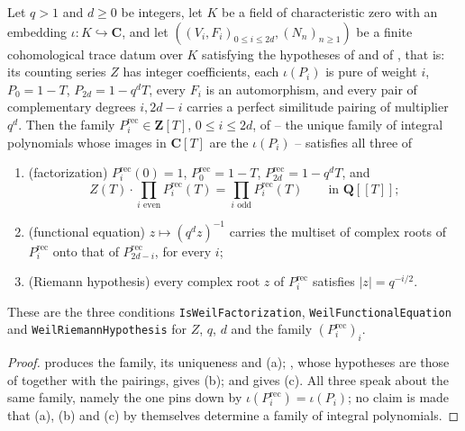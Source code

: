 \begin{theorem}
\label{thm:zla-weil-summary}
\leanok
Let $q>1$ and $d\geq0$ be integers, let $K$ be a field of characteristic zero
with an embedding $\iota:K\hookrightarrow\mathbf C$, and let
$((V_i,F_i)_{0\leq i\leq2d},(N_n)_{n\geq1})$ be a finite cohomological trace
datum over $K$ satisfying the hypotheses of
 and of
, that is: its counting series $Z$ has
integer coefficients, each $\iota(P_i)$ is pure of weight $i$,
$P_0=1-T$, $P_{2d}=1-q^dT$, every $F_i$ is an automorphism, and every pair of
complementary degrees $i,2d-i$ carries a perfect similitude pairing of
multiplier $q^d$.  Then the
family $P_i^{\mathrm{rec}}\in\mathbf Z[T]$, $0\leq i\leq2d$, of
 -- the unique family of integral
polynomials whose images in $\mathbf C[T]$ are the $\iota(P_i)$ -- satisfies
all three of
\begin{enumerate}[label=\textup{(\alph*)}]
\item \textup{(factorization)} $P_i^{\mathrm{rec}}(0)=1$,
      $P_0^{\mathrm{rec}}=1-T$, $P_{2d}^{\mathrm{rec}}=1-q^dT$, and
\[
  Z(T)\cdot\prod_{i\text{ even}}P_i^{\mathrm{rec}}(T)
  =\prod_{i\text{ odd}}P_i^{\mathrm{rec}}(T)
  \qquad\text{in }\mathbf Q[[T]];
\]
\item \textup{(functional equation)} $z\mapsto(q^dz)^{-1}$ carries the
      multiset of complex roots of $P_i^{\mathrm{rec}}$ onto that of
      $P_{2d-i}^{\mathrm{rec}}$, for every $i$;
\item \textup{(Riemann hypothesis)} every complex root $z$ of
      $P_i^{\mathrm{rec}}$ satisfies $|z|=q^{-i/2}$.
\end{enumerate}
These are the three conditions
\texttt{IsWeilFactorization}, \texttt{WeilFunctionalEquation} and
\texttt{WeilRiemannHypothesis} for $Z$, $q$, $d$ and the family
$(P_i^{\mathrm{rec}})_i$.
\end{theorem}
\begin{proof}
\leanok
{} produces the family, its uniqueness and
(a); , whose hypotheses are those of
 together with the pairings, gives (b); and
 gives (c).  All three speak about the same
family, namely the one  pins down by
$\iota(P_i^{\mathrm{rec}})=\iota(P_i)$; no claim is made that (a), (b) and
(c) by themselves determine a family of integral polynomials.
\end{proof}

